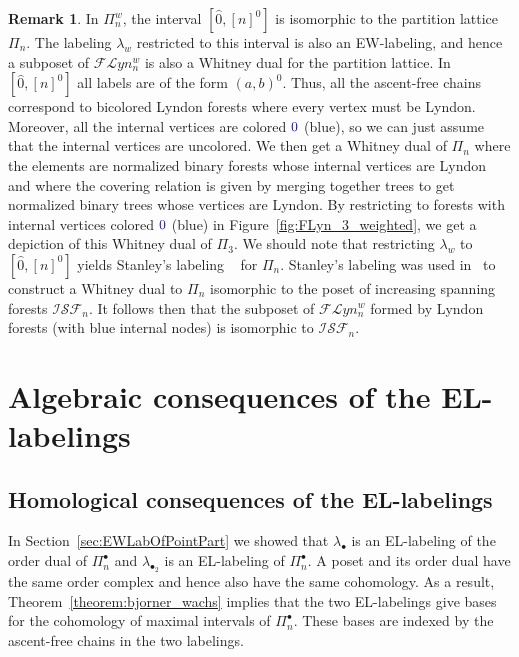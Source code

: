 \documentclass[11pt]{article}
\theoremstyle{definition}
\newtheorem{rema}[theo]{Remark}
\numberwithin{equation}{section}
\newcommand{\Flyn}{\mathcal{FL}yn}
\newcommand{\ISF}{\mathcal{ISF}}
\newcommand{\tbl}[1]{{\color{blue}{#1}}}
\begin{document}
\begin{rema}
In $\Pi_n^w$, the interval $[\hat{0}, [n]^0]$ is isomorphic to the partition lattice $\Pi_n$. The labeling $\lambda_w$ restricted to this interval is also an EW-labeling, and hence a subposet of $\Flyn_{n}^{w}$ is also a Whitney dual for the partition lattice.  In $[\hat{0}, [n]^0]$ all labels are of the form $(a,b)^0$. Thus, all the ascent-free chains correspond to  bicolored Lyndon forests where every vertex must be Lyndon.  Moreover, all the internal vertices are colored $\tbl{0}$ (blue), so we can just assume that the internal vertices are uncolored. We then get a Whitney dual of $\Pi_n$ where the elements are normalized binary forests whose internal vertices are Lyndon and where the covering relation is given by merging together trees to get normalized binary trees whose vertices are Lyndon. By restricting to forests with internal vertices colored $\tbl{0}$ (blue) in Figure~\ref{fig:FLyn_3_weighted}, we get a depiction of this Whitney dual of $\Pi_3$.  We should note that restricting $\lambda_w$ to $[\hat{0}, [n]^0]$ yields  Stanley's labeling ~\cite{Stanley1974} for $\Pi_n$.  Stanley's labeling  was used in~\cite[Corollary 5.7]{GonzalezHallam2021}  to construct a Whitney dual to $\Pi_n$ isomorphic to the poset of increasing spanning forests $\ISF_n$.  It follows then that the subposet of $\Flyn_{n}^{w}$ formed by Lyndon forests (with blue internal nodes) is isomorphic to $\ISF_n$. 



\end{rema}



\section{Algebraic consequences of the EL-labelings}\label{sec:algConseq}


 
\subsection{Homological consequences of the EL-labelings}
     In Section~\ref{sec:EWLabOfPointPart} we showed that $\lambda_{\bullet}$  is an EL-labeling of the order dual of $\Pi_n^\bullet$ and $\lambda_{\bullet_2}$ is an EL-labeling of $\Pi_n^\bullet$. A poset and its order dual have the same order complex and hence also have the same cohomology. As a result, Theorem~\ref{theorem:bjorner_wachs} implies that the two EL-labelings give bases for the cohomology of maximal intervals of $\Pi_n^\bullet$.  These bases are indexed by the ascent-free chains in the two labelings.  
     
\end{document}
